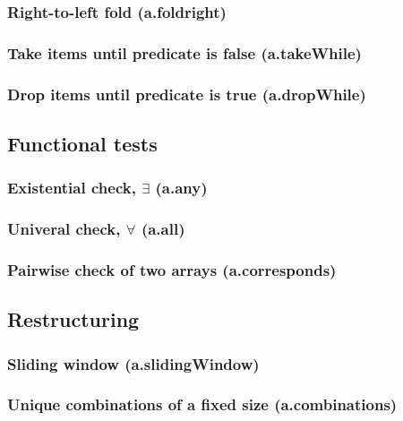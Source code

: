 \documentclass{article}
\theoremstyle{definition}
\begin{document}
\subsubsection{Right-to-left fold (a.foldright)}

\subsubsection{Take items until predicate is false (a.takeWhile)}

\subsubsection{Drop items until predicate is true (a.dropWhile)}

\subsection{Functional tests}

\subsubsection{Existential check, $\exists$ (a.any)}

\subsubsection{Univeral check, $\forall$ (a.all)}

\subsubsection{Pairwise check of two arrays (a.corresponds)}

\subsection{Restructuring}

\subsubsection{Sliding window (a.slidingWindow)}

\subsubsection{Unique combinations of a fixed size (a.combinations)}
\end{document}
